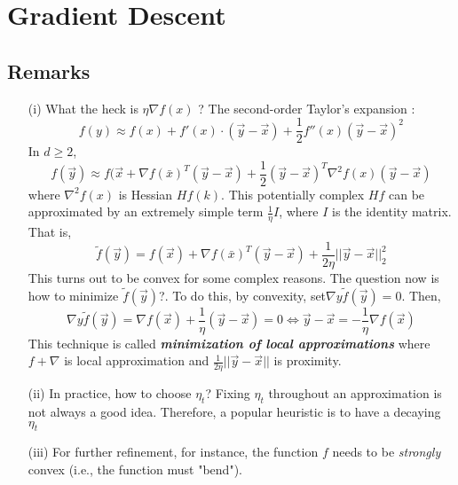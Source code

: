 \documentclass[12pt]{article}
\begin{document}
\MakeScribeTop
\section{Gradient Descent}
\subsection{Remarks}
\begin{itemize}
\item[(i)] What the heck is $ \eta \nabla f(x)$ ?
The second-order Taylor's expansion :
$$
f(y) \approx f(x) + f'(x)\cdot (\vec{y}-\vec{x}) + \frac{1}{2} f''(x)(\vec{y}-\vec{x})^2 
$$  
In $ d \geq 2$,
$$
f(\vec{y}) \approx f(\vec{x} + \nabla f(\bar{x})^T(\vec{y}-\vec{x}) +\frac{1}{2}(\vec{y}-\vec{x})^T \nabla^2f(x)(\vec{y}-\vec{x}) 
$$
where $\nabla^2f(x)$ is Hessian $Hf(k)$. This potentially complex $Hf$ can be approximated by an extremely simple term $\frac{1}{\eta}I$, where $I$ is the identity matrix. That is,
$$
\tilde{f}(\vec{y}) = f(\vec{x}) + \nabla f(\bar{x})^T(\vec{y}-\vec{x}) +\frac{1}{2\eta}||\vec{y}-\vec{x}||_2^2
$$ 
This turns out to be convex for some complex reasons. The question now is how to minimize $\tilde{f}(\vec{y}) $?. To do this, by convexity, set$ \nabla{y} \tilde{f}(\vec{y})  =0$. Then,
$$
 \nabla{y} \tilde{f}(\vec{y})  =  \nabla f(\vec{x}) + \frac{1}{\eta}(\vec{y}-\vec{x}) =0 \Longleftrightarrow \vec{y} -\vec{x} = -\frac{1}{\eta} \nabla f(\vec{x}) 
$$ 
This technique is called \textit{\textbf{minimization of local approximations}} where $f +\nabla$ is local approximation and $\frac{1}{2\eta}||\vec{y}-\vec{x}||$ is proximity. 
\item[(ii)] In practice,  how to  choose $\eta_t$? Fixing $\eta_t$ throughout an approximation is not always a good idea. Therefore, a popular heuristic is to have a decaying $\eta_t$
\item[(iii)] For further refinement, for instance,  the function $f$ needs to be \textit{strongly} convex (i.e.,  the function must "bend"). 
\end{itemize}
\end{document}
